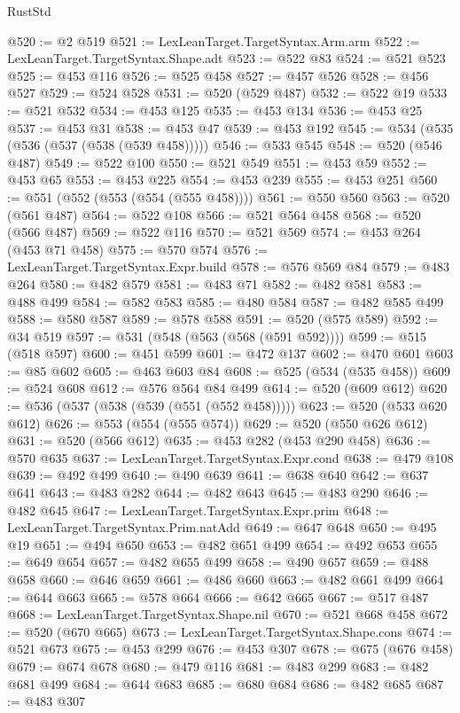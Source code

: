 \begin{lexlean}{RustStd}
\begin{coremodule}
{\begin{coremodule}
{{{{{{{{{{@520 := @2 @519
@521 := LexLeanTarget.TargetSyntax.Arm.arm
@522 := LexLeanTarget.TargetSyntax.Shape.adt
@523 := @522 @83
@524 := @521 @523
@525 := @453 @116
@526 := @525 @458
@527 := @457 @526
@528 := @456 @527
@529 := @524 @528
@531 := @520 (@529 @487)
@532 := @522 @19
@533 := @521 @532
@534 := @453 @125
@535 := @453 @134
@536 := @453 @25
@537 := @453 @31
@538 := @453 @47
@539 := @453 @192
@545 := @534 (@535 (@536 (@537 (@538 (@539 @458)))))
@546 := @533 @545
@548 := @520 (@546 @487)
@549 := @522 @100
@550 := @521 @549
@551 := @453 @59
@552 := @453 @65
@553 := @453 @225
@554 := @453 @239
@555 := @453 @251
@560 := @551 (@552 (@553 (@554 (@555 @458))))
@561 := @550 @560
@563 := @520 (@561 @487)
@564 := @522 @108
@566 := @521 @564 @458
@568 := @520 (@566 @487)
@569 := @522 @116
@570 := @521 @569
@574 := @453 @264 (@453 @71 @458)
@575 := @570 @574
@576 := LexLeanTarget.TargetSyntax.Expr.build
@578 := @576 @569 @84
@579 := @483 @264
@580 := @482 @579
@581 := @483 @71
@582 := @482 @581
@583 := @488 @499
@584 := @582 @583
@585 := @480 @584
@587 := @482 @585 @499
@588 := @580 @587
@589 := @578 @588
@591 := @520 (@575 @589)
@592 := @34 @519
@597 := @531 (@548 (@563 (@568 (@591 @592))))
@599 := @515 (@518 @597)
@600 := @451 @599
@601 := @472 @137
@602 := @470 @601
@603 := @85 @602
@605 := @463 @603 @84
@608 := @525 (@534 (@535 @458))
@609 := @524 @608
@612 := @576 @564 @84 @499
@614 := @520 (@609 @612)
@620 := @536 (@537 (@538 (@539 (@551 (@552 @458)))))
@623 := @520 (@533 @620 @612)
@626 := @553 (@554 (@555 @574))
@629 := @520 (@550 @626 @612)
@631 := @520 (@566 @612)
@635 := @453 @282 (@453 @290 @458)
@636 := @570 @635
@637 := LexLeanTarget.TargetSyntax.Expr.cond
@638 := @479 @108
@639 := @492 @499
@640 := @490 @639
@641 := @638 @640
@642 := @637 @641
@643 := @483 @282
@644 := @482 @643
@645 := @483 @290
@646 := @482 @645
@647 := LexLeanTarget.TargetSyntax.Expr.prim
@648 := LexLeanTarget.TargetSyntax.Prim.natAdd
@649 := @647 @648
@650 := @495 @19
@651 := @494 @650
@653 := @482 @651 @499
@654 := @492 @653
@655 := @649 @654
@657 := @482 @655 @499
@658 := @490 @657
@659 := @488 @658
@660 := @646 @659
@661 := @486 @660
@663 := @482 @661 @499
@664 := @644 @663
@665 := @578 @664
@666 := @642 @665
@667 := @517 @487
@668 := LexLeanTarget.TargetSyntax.Shape.nil
@670 := @521 @668 @458
@672 := @520 (@670 @665)
@673 := LexLeanTarget.TargetSyntax.Shape.cons
@674 := @521 @673
@675 := @453 @299
@676 := @453 @307
@678 := @675 (@676 @458)
@679 := @674 @678
@680 := @479 @116
@681 := @483 @299
@683 := @482 @681 @499
@684 := @644 @683
@685 := @680 @684
@686 := @482 @685
@687 := @483 @307
}}}}}}}}}}
\end{coremodule}}
\end{coremodule}
\end{lexlean}
